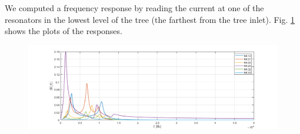 \documentclass[a4paper]{article}
\begin{document}
We computed a frequency response by reading the current at one of the resonators in the lowest level of the tree (the farthest from the tree inlet). Fig. \ref{fig:es2} shows the plots of the responses.



\begin{figure}[h!]
	\centering
	\includegraphics[width=0.7\linewidth]{es2.png}
	\caption{}
	\label{fig:es2}
\end{figure}
\end{document}

